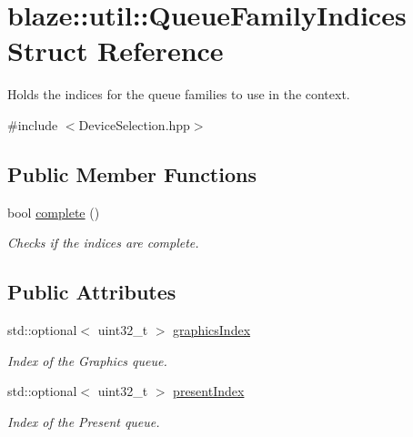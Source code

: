\hypertarget{structblaze_1_1util_1_1QueueFamilyIndices}{}\section{blaze\+:\+:util\+:\+:Queue\+Family\+Indices Struct Reference}
\label{structblaze_1_1util_1_1QueueFamilyIndices}


Holds the indices for the queue families to use in the context.  




{\ttfamily \#include $<$Device\+Selection.\+hpp$>$}

\subsection*{Public Member Functions}
\begin{DoxyCompactItemize}
\item 
bool \hyperlink{structblaze_1_1util_1_1QueueFamilyIndices_a23bf708816aa6ff4e554610003056885}{complete} ()
\begin{DoxyCompactList}\small\item\em Checks if the indices are complete. \end{DoxyCompactList}\end{DoxyCompactItemize}
\subsection*{Public Attributes}
\begin{DoxyCompactItemize}
\item 
\mbox{\label{structblaze_1_1util_1_1QueueFamilyIndices_a792f5437b3e7b04b659e5417fce76521}} 
std\+::optional$<$ uint32\+\_\+t $>$ \hyperlink{structblaze_1_1util_1_1QueueFamilyIndices_a792f5437b3e7b04b659e5417fce76521}{graphics\+Index}
\begin{DoxyCompactList}\small\item\em Index of the Graphics queue. \end{DoxyCompactList}\item 
\mbox{\label{structblaze_1_1util_1_1QueueFamilyIndices_a761cf0b5c1e52ca4a44a175245b6cba7}} 
std\+::optional$<$ uint32\+\_\+t $>$ \hyperlink{structblaze_1_1util_1_1QueueFamilyIndices_a761cf0b5c1e52ca4a44a175245b6cba7}{present\+Index}
\begin{DoxyCompactList}\small\item\em Index of the Present queue. \end{DoxyCompactList}\end{DoxyCompactItemize}


